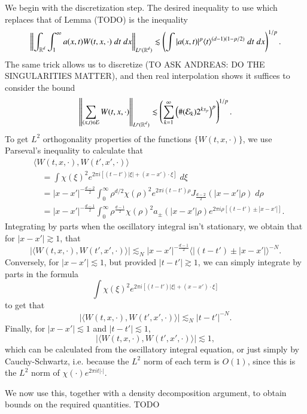 We begin with the discretization step. The desired inequality to use which replaces that of Lemma (TODO) is the inequality
%
\begin{align*}
    \left\| \int_{\operatorname{\mathbb{R}}^d} \int_1^\infty a(x,t) W(t,x,\cdot)\; dt\; dx \right\|_{L^p(\operatorname{\mathbb{R}}^d)} \lesssim \left( \int |a(x,t)|^p \langle t \rangle^{(d-1)(1 - p/2)}\; dt\; dx \right)^{1/p}.
\end{align*}
%
The same trick allows us to discretize (TO ASK ANDREAS: DO THE SINGULARITIES MATTER), and then real interpolation shows it suffices to consider the bound
%
\[ \left\| \sum_{(x,t) \in \mathcal{E}} W(t,x,\cdot) \right\|_{L^p(\operatorname{\mathbb{R}}^d)} \lesssim \left( \sum_{k = 1}^\infty \left( \#(\mathcal{E}_k) 2^{ks_p} \right)^p \right)^{1/p}. \]
%
To get $L^2$ orthogonality properties of the functions $\{ W(t,x,\cdot) \}$, we use Parseval's inequality to calculate that
%
\begin{align*}
    &\langle W(t,x,\cdot), W(t',x',\cdot) \rangle\\
    &\quad = \int \chi(\xi)^2 e^{2 \pi i[(t - t')|\xi| + (x - x') \cdot \xi]}\; d\xi\\
    &\quad = |x - x'|^{- \frac{d-2}{2}} \int_0^\infty \rho^{d/2} \chi(\rho)^2 e^{2 \pi i (t - t') \rho} J_{\frac{d-2}{2}}(|x - x'| \rho)\; d\rho\\
    &\quad = |x - x'|^{- \frac{d-1}{2}} \int_0^\infty \rho^{\frac{d-1}{2}} \chi(\rho)^2 a_{\pm}(|x - x'| \rho) e^{2 \pi i \rho [(t - t') \pm |x - x'|]}.
\end{align*}
%
Integrating by parts when the oscillatory integral isn't stationary, we obtain that for $|x - x'| \gtrsim 1$, that
%
\[ |\langle W(t,x,\cdot), W(t',x',\cdot) \rangle| \lesssim_N |x - x'|^{- \frac{d-1}{2}} \big\langle |(t - t') \pm |x - x'| \big\rangle^{-N}. \]
%
Conversely, for $|x - x'| \lesssim 1$, but provided $|t - t'| \gtrsim 1$, we can simply integrate by parts in the formula
%
\[ \int \chi(\xi)^2 e^{2 \pi i [ (t - t') |\xi| + (x - x') \cdot \xi ]} \]
%
to get that
%
\[ |\langle W(t,x,\cdot), W(t',x',\cdot) \rangle| \lesssim_N |t - t'|^{-N}. \]
%
Finally, for $|x - x'| \lesssim 1$ and $|t - t'| \lesssim 1$,
%
\[ |\langle W(t,x,\cdot), W(t',x',\cdot) \rangle| \lesssim 1, \]
%
which can be calculated from the oscillatory integral equation, or just simply by Cauchy-Schwartz, i.e. because the $L^2$ norm of each term is $O(1)$, since this is the $L^2$ norm of $\chi(\cdot) e^{2 \pi i t |\cdot|}$.

We now use this, together with a density decomposition argument, to obtain bounds on the required quantities. TODO


